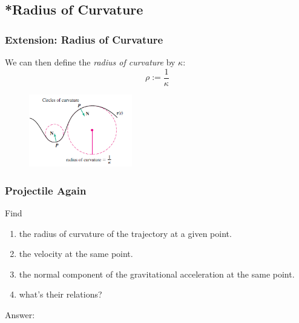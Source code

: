 \documentclass[12pt, t]{beamer}
\renewcommand{\emph}[1]{{\color{Turquoise3}\textsl{#1}}}
\begin{document}
\subsection{*Radius of Curvature}
\begin{frame}
    \frametitle{Extension: Radius of Curvature}
    We can then define the \emph{radius of curvature} by $\kappa$:
    $$\rho:=\dfrac{1}{\kappa}$$
    \begin{figure}[H]
        \centering
        \includegraphics[width=0.4\textwidth]{2020-06-24-22-07-55.png}
    \end{figure}
\end{frame}

\begin{frame}[allowframebreaks]
    \frametitle{Projectile Again}
    Find
    \begin{enumerate}
        \item the radius of curvature of the trajectory at a given point.
        \item the velocity at the same point.
        \item the normal component of the gravitational acceleration at the same point.
        \item what's their relations?
    \end{enumerate}
    \newpage
    Answer:
\end{frame}
\end{document}
